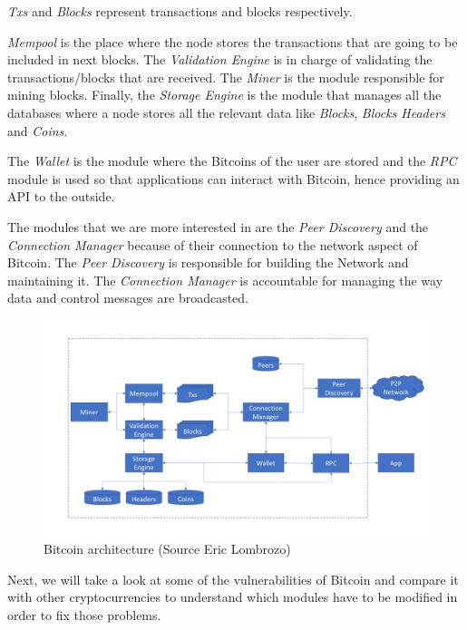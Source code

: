 \textit{Txs} and \textit{Blocks} represent transactions and blocks respectively.

\textit{Mempool} is the place where the node stores the transactions that are going to be included in next blocks. The \textit{Validation Engine} is in charge of validating the transactions/blocks that are received. The \textit{Miner} is the module responsible for mining blocks. Finally, the \textit{Storage Engine} is the module that manages all the databases where a node stores all the relevant data like \textit{Blocks}, \textit{Blocks Headers} and \textit{Coins}.

The \textit{Wallet} is the module where the Bitcoins of the user are stored and the \textit{RPC} module is used so that applications can interact with Bitcoin, hence providing an API to the outside. 

The modules that we are more interested in are the \textit{Peer Discovery} and the \textit{Connection Manager} because of their connection to the network aspect of Bitcoin. The \textit{Peer Discovery} is responsible for building the Network and maintaining it. The \textit{Connection Manager} is accountable for managing the way data and control messages are broadcasted.

\begin{figure}[h]
\centering
\includegraphics[scale=0.4]{figs/My-Bitcoin-Core-architecture}
\caption{Bitcoin architecture (Source Eric Lombrozo)}
\label{fig:bitcoinoverview}
\end{figure}

Next, we will take a look at some of the vulnerabilities of Bitcoin and compare it with other cryptocurrencies to understand which modules have to be modified in order to fix those problems.


